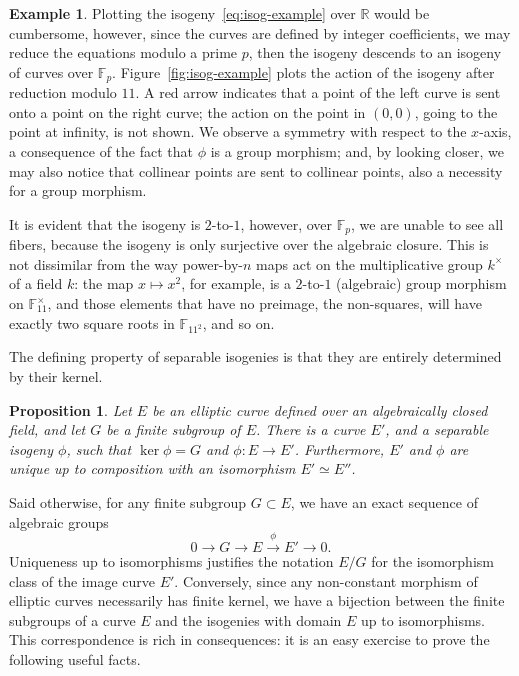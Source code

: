 \documentclass[10pt]{article}
\theoremstyle{plain}
\newtheorem{proposition}[theorem]{Proposition}
\theoremstyle{definition}
\newtheorem{example}[theorem]{Example}
\def\F{\ensuremath{\mathbb{F}}}
\begin{document}
\begin{example}
  Plotting the isogeny~\eqref{eq:isog-example} over $ℝ$ would be
  cumbersome, however, since the curves are defined by integer
  coefficients, we may reduce the equations modulo a prime $p$, then
  the isogeny descends to an isogeny of curves over $\F_p$. %
  Figure~\ref{fig:isog-example} plots the action of the isogeny after
  reduction modulo $11$. %
  A red arrow indicates that a point of the left curve is sent onto a
  point on the right curve; the action on the point in $(0,0)$, going to
  the point at infinity, is not shown. %
  We observe a symmetry with respect to the $x$-axis, a consequence of
  the fact that $ϕ$ is a group morphism; and, by looking closer, we may
  also notice that collinear points are sent to collinear points, also a
  necessity for a group morphism. %

  It is evident that the isogeny is $2$-to-$1$, however, over $\F_p$,
  we are unable to see all fibers, because the isogeny is only
  surjective over the algebraic closure. %
  This is not dissimilar from the way power-by-$n$ maps act on the
  multiplicative group $k^×$ of a field $k$: the map $x↦x^2$, for
  example, is a $2$-to-$1$ (algebraic) group morphism on
  $\F_{11}^\times$, and those elements that have no preimage, the
  non-squares, will have exactly two square roots in $\F_{11^2}$, and
  so on. %
\end{example}

The defining property of separable isogenies is that they are entirely
determined by their kernel. %

\begin{proposition}
  \label{prop:isoker}
  Let $E$ be an elliptic curve defined over an algebraically closed
  field, and let $G$ be a finite subgroup of $E$. %
  There is a curve $E'$, and a separable isogeny $ϕ$, such that
  $\ker ϕ=G$ and $ϕ:E→ E'$. %
  Furthermore, $E'$ and $ϕ$ are unique up to composition with an
  isomorphism $E'≃E''$. %
\end{proposition}

Said otherwise, for any finite subgroup $G⊂E$, we have an exact
sequence of algebraic groups
\begin{equation*}
  0 → G → E \overset{ϕ}{→} E' → 0.
\end{equation*}
Uniqueness up to isomorphisms justifies the notation $E/G$ for the
isomorphism class of the image curve $E'$. %
Conversely, since any non-constant morphism of elliptic curves
necessarily has finite kernel, we have a bijection between the finite
subgroups of a curve $E$ and the isogenies with domain $E$ up to
isomorphisms. %
This correspondence is rich in consequences: it is an easy exercise to
prove the following useful facts. %
\end{document}

